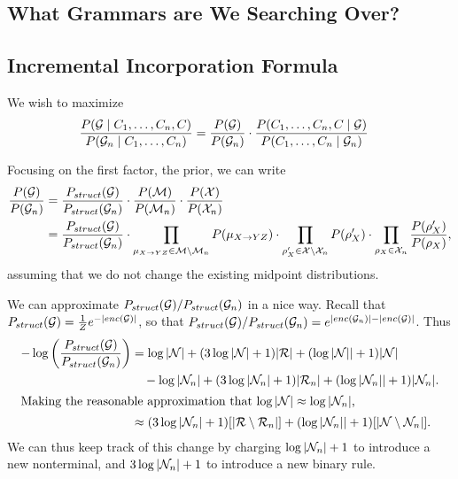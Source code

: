 \subsection{What Grammars are We Searching Over?}

\subsection{Incremental Incorporation Formula}

We wish to maximize 
\begin{align*}
\frac{P({\mathcal G} \mid C_1, \dots, C_n, C)}{P({\mathcal G}_n\mid C_1, \dots, C_n)}
&= \frac{P({\mathcal G})}{P({\mathcal G}_n)} \cdot 
\frac{P(C_1,\dots,C_n, C\mid {\mathcal G})}{P(C_1,\dots,C_n \mid {\mathcal G}_n)}
\end{align*}

Focusing on the first factor, the prior, we can write
\begin{align*}
\frac{P({\mathcal G})}{P({\mathcal G}_n)} &=
\frac{P_{struct}({\mathcal G})}{P_{struct}({\mathcal G}_n)}
\cdot
\frac{P({\mathcal M})}{P({\mathcal M}_n)}
\cdot
\frac{P({\mathcal X})}{P({\mathcal X}_n)} \\
&= 
\frac{P_{struct}({\mathcal G})}{P_{struct}({\mathcal G}_n)}
\cdot
\prod_{\mu_{X\to YZ}\in {\mathcal M}\setminus {\mathcal M}_n} P(\mu_{X\to YZ})
\cdot
\prod_{\rho'_X \in {\mathcal X} \setminus {\mathcal X}_n} P(\rho'_X)
\cdot 
\prod_{\rho_X \in {\mathcal X}_n} \frac{P(\rho'_X)}{P(\rho_X)},\\
\end{align*}
assuming that we do not change the existing midpoint distributions.

We can approximate $P_{struct}({\mathcal G})/P_{struct}({\mathcal G}_n)$ in a nice
way. Recall that $P_{struct}({\mathcal G}) = \frac{1}{Z} e^{-|enc({\mathcal G})|}$, so
that $P_{struct}({\mathcal G})/P_{struct}({\mathcal G}_n) = e^{ |enc({\mathcal G}_n)| -
  |enc({\mathcal G})|}$. Thus
\begin{align*}
-\log\left(\frac{P_{struct}({\mathcal G})}{P_{struct}({\mathcal G}_n)}\right) &=
\log |{\mathcal N}| + (3 \log |{\mathcal N}| + 1)|{\mathcal R}| + (\log|{\mathcal N}|| + 1)|{\mathcal N}| \\ 
&\quad - \log |{\mathcal N}_n| + (3 \log |{\mathcal N}_n| + 1)|{\mathcal R}_n| + (\log|{\mathcal N}_n|| + 1)|{\mathcal N}_n|. \\ 
\intertext{Making the reasonable approximation that
$\log|{\mathcal N}| \approx \log |{\mathcal N}_n|$,}
&\approx (3 \log |{\mathcal N}_n| + 1)[|{\mathcal R} \setminus {\mathcal R}_n|] + 
(\log|{\mathcal N}_n|| + 1) [|{\mathcal N} \setminus {\mathcal N}_n|]. \\ 
\end{align*}
We can thus keep track of this change by charging $\log|{\mathcal N}_n|+1$ to
introduce a new nonterminal, and $3\log|{\mathcal N}_n|+1$ to introduce a new
binary rule.

